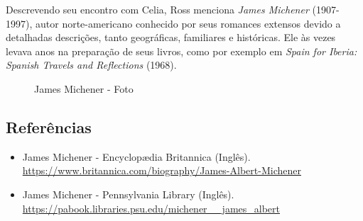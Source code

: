 Descrevendo seu encontro com Celia, Ross menciona \emph{James Michener}
(1907-1997), autor norte-americano conhecido por seus romances extensos
devido a detalhadas descrições, tanto geográficas, familiares e
históricas. Ele às vezes levava anos na preparação de seus livros, como
por exemplo em \emph{Spain for Iberia: Spanish Travels and Reflections}
(1968).

\begin{figure}
  \centering
    \caption{James Michener - Foto\label{fig:james-michener-foto}}
\end{figure}

\hypertarget{referuxeancias-5}{%
\subsection{Referências}\label{referuxeancias-5}}

\begin{itemize}
\tightlist
\item
  \sloppy James Michener - Encyclopædia Britannica (Inglês). \url{https://www.britannica.com/biography/James-Albert-Michener}
\item
  \sloppy James Michener - Pennsylvania Library (Inglês). \url{https://pabook.libraries.psu.edu/michener__james_albert}
\end{itemize}
